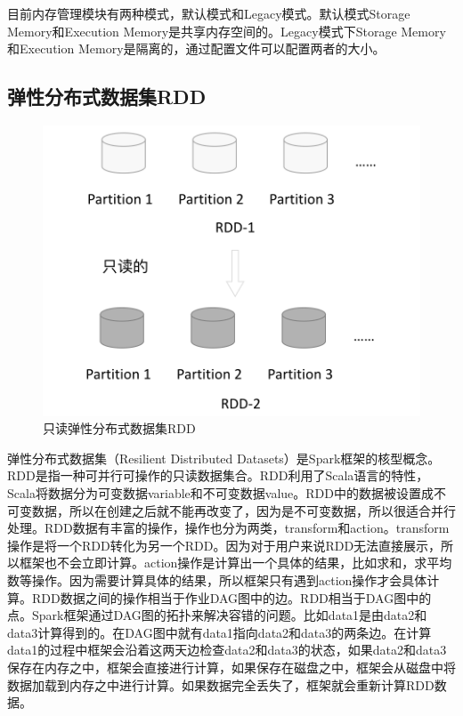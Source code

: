 目前内存管理模块有两种模式，默认模式和Legacy模式。默认模式Storage Memory和Execution Memory是共享内存空间的。Legacy模式下Storage Memory和Execution Memory是隔离的，通过配置文件可以配置两者的大小。

\subsection{弹性分布式数据集RDD}

\begin{figure}
    \centering
    \includegraphics[width=1\textwidth]{Img/rdd-readonly.png}
    \caption{只读弹性分布式数据集RDD}
    \label{fig:rdd}
\end{figure}

弹性分布式数据集（Resilient Distributed Datasets）是Spark框架的核型概念。RDD是指一种可并行可操作的只读数据集合。RDD利用了Scala语言的特性，Scala将数据分为可变数据variable和不可变数据value。RDD中的数据被设置成不可变数据，所以在创建之后就不能再改变了，因为是不可变数据，所以很适合并行处理。RDD数据有丰富的操作，操作也分为两类，transform和action。transform操作是将一个RDD转化为另一个RDD。因为对于用户来说RDD无法直接展示，所以框架也不会立即计算。action操作是计算出一个具体的结果，比如求和，求平均数等操作。因为需要计算具体的结果，所以框架只有遇到action操作才会具体计算。RDD数据之间的操作相当于作业DAG图中的边。RDD相当于DAG图中的点。Spark框架通过DAG图的拓扑来解决容错的问题。比如data1是由data2和data3计算得到的。在DAG图中就有data1指向data2和data3的两条边。在计算data1的过程中框架会沿着这两天边检查data2和data3的状态，如果data2和data3保存在内存之中，框架会直接进行计算，如果保存在磁盘之中，框架会从磁盘中将数据加载到内存之中进行计算。如果数据完全丢失了，框架就会重新计算RDD数据。

